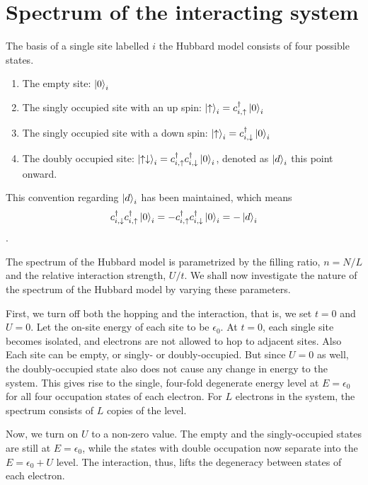 \documentclass[]{report}
\begin{document}
\section{Spectrum of the interacting system}\label{sec:spectrum}
The basis of a single site labelled $ i $ the Hubbard model consists of four possible states.
\begin{enumerate}
	\item The empty site: $ \ket{0}_i $
	\item The singly occupied site with an up spin: $ \ket{\uparrow}_i = c^{\dagger}_{i, \uparrow} \ket{0}_i$ 
	\item The singly occupied site with a down spin: $ \ket{\uparrow}_i = c^{\dagger}_{i, \downarrow} \ket{0}_i$
	\item The doubly occupied site: $ \ket{\uparrow\downarrow}_i = c^{\dagger}_{i, \uparrow} c^{\dagger}_{i, \downarrow} \ket{0}_i $, denoted as $ \ket{d}_i $ this point onward.
\end{enumerate}

This convention regarding $ \ket{d}_i $ has been maintained, which means $$ c^{\dagger}_{i, \downarrow} c^{\dagger}_{i, \uparrow}  \ket{0}_i  = - c^{\dagger}_{i, \uparrow} c^{\dagger}_{i, \downarrow} \ket{0}_i = -\ket{d}_i $$.

The spectrum of the Hubbard model is parametrized by the filling ratio, $ n = N/L $ and the relative interaction strength, $ U/t $. We shall now investigate the nature of the spectrum of the Hubbard model by varying these parameters.

First, we turn off both the hopping and the interaction, that is, we set $ t=0 $ and $ U=0 $. Let the on-site energy of each site to be $ \epsilon_0$. At $ t=0 $, each single site becomes isolated, and electrons are not allowed to hop to adjacent sites. Also Each site can be empty, or singly- or doubly-occupied. But since $ U=0 $ as well, the doubly-occupied state also does not cause any change in energy to the system. This gives rise to the single, four-fold degenerate energy level at $ E=\epsilon_0 $ for all four occupation states of each electron. For $ L $ electrons in the system, the spectrum consists of $ L $ copies of the level.

Now, we turn on $ U $ to a non-zero value. The empty and the singly-occupied states are still at $ E = \epsilon_0 $, while the states with double occupation now separate into the $ E = \epsilon_0 + U $ level. The interaction, thus, lifts the degeneracy between states of each electron.
\end{document}
